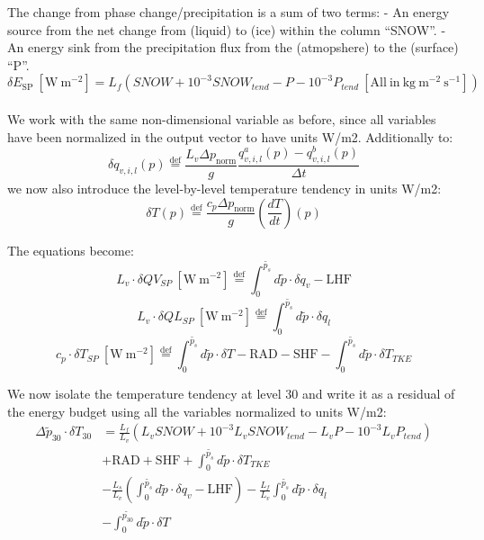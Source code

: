 \documentclass[11pt]{article}
\begin{document}
The change from phase change/precipitation is a sum of two terms: - An
energy source from the net change from (liquid) to (ice) within the
column ``SNOW''. - An energy sink from the precipitation flux from the
(atmopshere) to the (surface) ``P''. \[
\delta E_{\mathrm{SP}}\ \left[\mathrm{W\ m^{-2}}\right]=L_{f}\left(SNOW+10^{-3}SNOW_{tend}-P-10^{-3}P_{tend}\ \left[\mathrm{All\ in\ kg\ m^{-2}\ s^{-1}}\right]\right)
\]\\
We work with the same non-dimensional variable as before, since all
variables have been normalized in the output vector to have units W/m2.
Additionally to: \[
\delta q_{v,i,l}\left(p\right)\overset{\mathrm{def}}{=}\frac{L_{v}\Delta p_{\mathrm{norm}}}{g}\frac{q_{v,i,l}^{a}\left(p\right)-q_{v,i,l}^{b}\left(p\right)}{\Delta t}
\] we now also introduce the level-by-level temperature tendency in
units W/m2: \[
\delta T\left(p\right)\overset{\mathrm{def}}{=}\frac{c_{p}\Delta p_{\mathrm{norm}}}{g}\left(\frac{dT}{dt}\right)\left(p\right)
\]

The equations become: \[
L_{v}\cdot\delta QV_{SP}\ \left[\mathrm{W\ m^{-2}}\right]\overset{\mathrm{def}}{=}\int_{0}^{\widetilde{p_{s}}}d\widetilde{p}\cdot\delta q_{v}-\mathrm{LHF}
\] \[
L_{v}\cdot\delta QL_{SP}\ \left[\mathrm{W\ m^{-2}}\right]\overset{\mathrm{def}}{=}\int_{0}^{\widetilde{p_{s}}}d\widetilde{p}\cdot\delta q_{l}
\] \[
c_{p}\cdot\delta T_{SP}\ \left[\mathrm{W\ m^{-2}}\right]\overset{\mathrm{def}}{=}\int_{0}^{\widetilde{p_{s}}}d\widetilde{p}\cdot\delta T-\mathrm{RAD}-\mathrm{SHF}-\int_{0}^{\widetilde{p_{s}}}d\widetilde{p}\cdot\delta T_{TKE}
\]

We now isolate the temperature tendency at level 30 and write it as a
residual of the energy budget using all the variables normalized to
units W/m2: \[
\begin{aligned}\Delta\widetilde{p}_{30}\cdot\delta T_{30} & =\frac{L_{f}}{L_{v}}\left(L_{v}SNOW+10^{-3}L_{v}SNOW_{tend}-L_{v}P-10^{-3}L_{v}P_{tend}\right)\\
 & +\mathrm{RAD}+\mathrm{SHF}+\int_{0}^{\widetilde{p_{s}}}d\widetilde{p}\cdot\delta T_{TKE}\\
 & -\frac{L_{s}}{L_{v}}\left(\int_{0}^{\widetilde{p_{s}}}d\widetilde{p}\cdot\delta q_{v}-\mathrm{LHF}\right)-\frac{L_{f}}{L_{v}}\int_{0}^{\widetilde{p_{s}}}d\widetilde{p}\cdot\delta q_{l}\\
 & -\int_{0}^{\widetilde{p_{30}}}d\widetilde{p}\cdot\delta T
\end{aligned}
\]
\end{document}
